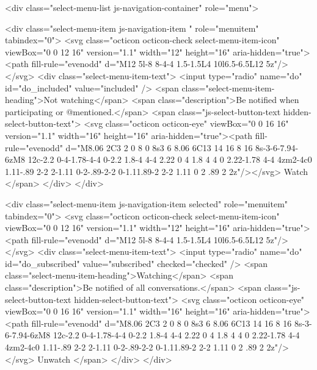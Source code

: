               <div class="select-menu-list js-navigation-container" role="menu">

                <div class="select-menu-item js-navigation-item " role="menuitem" tabindex="0">
                  <svg class="octicon octicon-check select-menu-item-icon" viewBox="0 0 12 16" version="1.1" width="12" height="16" aria-hidden="true"><path fill-rule="evenodd" d="M12 5l-8 8-4-4 1.5-1.5L4 10l6.5-6.5L12 5z"/></svg>
                  <div class="select-menu-item-text">
                    <input type="radio" name="do" id="do_included" value="included" />
                    <span class="select-menu-item-heading">Not watching</span>
                    <span class="description">Be notified when participating or @mentioned.</span>
                    <span class="js-select-button-text hidden-select-button-text">
                      <svg class="octicon octicon-eye" viewBox="0 0 16 16" version="1.1" width="16" height="16" aria-hidden="true"><path fill-rule="evenodd" d="M8.06 2C3 2 0 8 0 8s3 6 8.06 6C13 14 16 8 16 8s-3-6-7.94-6zM8 12c-2.2 0-4-1.78-4-4 0-2.2 1.8-4 4-4 2.22 0 4 1.8 4 4 0 2.22-1.78 4-4 4zm2-4c0 1.11-.89 2-2 2-1.11 0-2-.89-2-2 0-1.11.89-2 2-2 1.11 0 2 .89 2 2z"/></svg>
                      Watch
                    </span>
                  </div>
                </div>

                <div class="select-menu-item js-navigation-item selected" role="menuitem" tabindex="0">
                  <svg class="octicon octicon-check select-menu-item-icon" viewBox="0 0 12 16" version="1.1" width="12" height="16" aria-hidden="true"><path fill-rule="evenodd" d="M12 5l-8 8-4-4 1.5-1.5L4 10l6.5-6.5L12 5z"/></svg>
                  <div class="select-menu-item-text">
                    <input type="radio" name="do" id="do_subscribed" value="subscribed" checked="checked" />
                    <span class="select-menu-item-heading">Watching</span>
                    <span class="description">Be notified of all conversations.</span>
                    <span class="js-select-button-text hidden-select-button-text">
                      <svg class="octicon octicon-eye" viewBox="0 0 16 16" version="1.1" width="16" height="16" aria-hidden="true"><path fill-rule="evenodd" d="M8.06 2C3 2 0 8 0 8s3 6 8.06 6C13 14 16 8 16 8s-3-6-7.94-6zM8 12c-2.2 0-4-1.78-4-4 0-2.2 1.8-4 4-4 2.22 0 4 1.8 4 4 0 2.22-1.78 4-4 4zm2-4c0 1.11-.89 2-2 2-1.11 0-2-.89-2-2 0-1.11.89-2 2-2 1.11 0 2 .89 2 2z"/></svg>
                        Unwatch
                    </span>
                  </div>
                </div>

